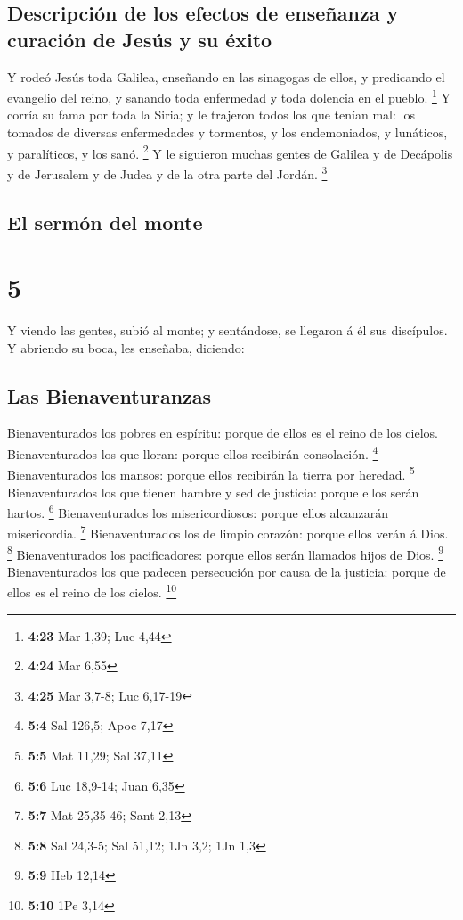 \hypertarget{descripciuxf3n-de-los-efectos-de-enseuxf1anza-y-curaciuxf3n-de-jesuxfas-y-su-uxe9xito}{%
\subsection{Descripción de los efectos de enseñanza y curación de Jesús
y su
éxito}\label{descripciuxf3n-de-los-efectos-de-enseuxf1anza-y-curaciuxf3n-de-jesuxfas-y-su-uxe9xito}}

 Y rodeó Jesús toda Galilea, enseñando en las sinagogas
de ellos, y predicando el evangelio del reino, y sanando toda enfermedad
y toda dolencia en el pueblo. \footnote{\textbf{4:23} Mar 1,39; Luc 4,44}
 Y corría su fama por toda la Siria; y le trajeron todos
los que tenían mal: los tomados de diversas enfermedades y tormentos, y
los endemoniados, y lunáticos, y paralíticos, y los sanó. \footnote{\textbf{4:24}
  Mar 6,55}  Y le siguieron muchas gentes de Galilea y de
Decápolis y de Jerusalem y de Judea y de la otra parte del Jordán.
\footnote{\textbf{4:25} Mar 3,7-8; Luc 6,17-19}

\hypertarget{el-sermuxf3n-del-monte}{%
\subsection{El sermón del monte}\label{el-sermuxf3n-del-monte}}

\hypertarget{section-4}{%
\section{5}\label{section-4}}

 Y viendo las gentes, subió al monte; y sentándose, se
llegaron á él sus discípulos.  Y abriendo su boca, les
enseñaba, diciendo:

\hypertarget{las-bienaventuranzas}{%
\subsection{Las Bienaventuranzas}\label{las-bienaventuranzas}}

 Bienaventurados los pobres en espíritu: porque de ellos
es el reino de los cielos.  Bienaventurados los que
lloran: porque ellos recibirán consolación. \footnote{\textbf{5:4} Sal
  126,5; Apoc 7,17}  Bienaventurados los mansos: porque
ellos recibirán la tierra por heredad. \footnote{\textbf{5:5} Mat 11,29;
  Sal 37,11}  Bienaventurados los que tienen hambre y sed
de justicia: porque ellos serán hartos. \footnote{\textbf{5:6} Luc
  18,9-14; Juan 6,35}  Bienaventurados los
misericordiosos: porque ellos alcanzarán misericordia. \footnote{\textbf{5:7}
  Mat 25,35-46; Sant 2,13}  Bienaventurados los de limpio
corazón: porque ellos verán á Dios. \footnote{\textbf{5:8} Sal 24,3-5;
  Sal 51,12; 1Jn 3,2; 1Jn 1,3}  Bienaventurados los
pacificadores: porque ellos serán llamados hijos de Dios. \footnote{\textbf{5:9}
  Heb 12,14}  Bienaventurados los que padecen persecución
por causa de la justicia: porque de ellos es el reino de los cielos.
\footnote{\textbf{5:10} 1Pe 3,14}

